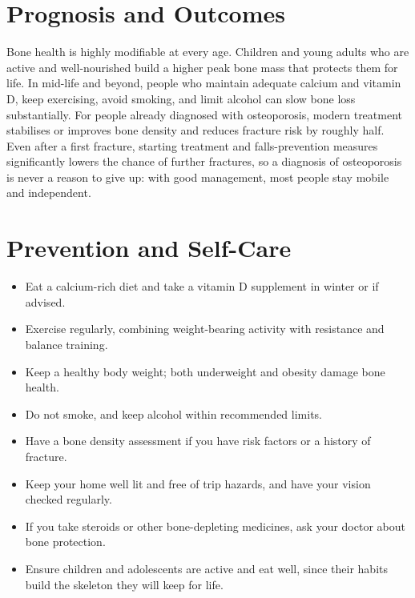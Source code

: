\section*{Prognosis and Outcomes}
Bone health is highly modifiable at every age. Children and young adults who are active and well-nourished build a higher peak bone mass that protects them for life. In mid-life and beyond, people who maintain adequate calcium and vitamin D, keep exercising, avoid smoking, and limit alcohol can slow bone loss substantially. For people already diagnosed with osteoporosis, modern treatment stabilises or improves bone density and reduces fracture risk by roughly half. Even after a first fracture, starting treatment and falls-prevention measures significantly lowers the chance of further fractures, so a diagnosis of osteoporosis is never a reason to give up: with good management, most people stay mobile and independent.

\section*{Prevention and Self-Care}
\begin{itemize}
    \item Eat a calcium-rich diet and take a vitamin D supplement in winter or if advised.
    \item Exercise regularly, combining weight-bearing activity with resistance and balance training.
    \item Keep a healthy body weight; both underweight and obesity damage bone health.
    \item Do not smoke, and keep alcohol within recommended limits.
    \item Have a bone density assessment if you have risk factors or a history of fracture.
    \item Keep your home well lit and free of trip hazards, and have your vision checked regularly.
    \item If you take steroids or other bone-depleting medicines, ask your doctor about bone protection.
    \item Ensure children and adolescents are active and eat well, since their habits build the skeleton they will keep for life.
\end{itemize}

